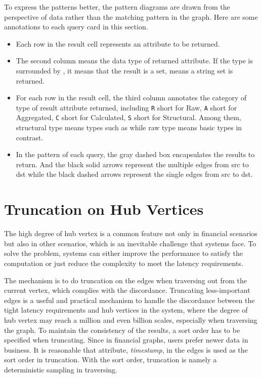 To express the patterns better, the pattern diagrams are drawn from the perspective
of data rather than the matching pattern in the graph. Here are some annotations to each
query card in this section.
\begin{itemize}
    \item Each row in the result cell represents an attribute to be returned.
    \item The second column means the data type of returned attribute.
          If the type is surrounded by \type{\{\}}, it means that the result is a
          set, \eg {} means a string set is returned.
    \item For each row in the result cell, the third column annotates the
          category of type of result attribute returned, including \texttt{R} short
          for Raw, \texttt{A} short for Aggregated, \texttt{C} short for Calculated,
          \texttt{S} short for Structural. Among them, structural type means types
          such as  while raw type means basic types in contrast.
   \item In the pattern of each query, the gray dashed box encapsulates the results
         to return. And the black solid arrows represent the multiple edges from src
         to dst while the black dashed arrows represent the single edges from src to dst.
\end{itemize}


\section{Truncation on Hub Vertices}
\label{sec:truncation-on-hub-vertices}

The high degree of hub vertex is a common feature not only in financial scenarios but also in other scenarios, which is
an inevitable challenge that systems face. To solve the problem, systems can either improve the performance to satisfy
the computation or just reduce the complexity to meet the latency requirements.

The mechanism is to do truncation on the edges when traversing out from the current vertex, which complies with the
discordance. Truncating less-important edges is a useful and practical mechanism to handle the discordance between the
tight latency requirements and hub vertices in the system, where the degree of hub vertex may reach a million and even
billion scales, especially when traversing the graph. To maintain the consistency of the results, a sort order has
to be specified when truncating. Since in financial graphs, users prefer newer data in business. It is reasonable that
attribute, \emph{timestamp}, in the edges is used as the sort order in truncation. With the sort order, truncation is
namely a deterministic sampling in traversing.

